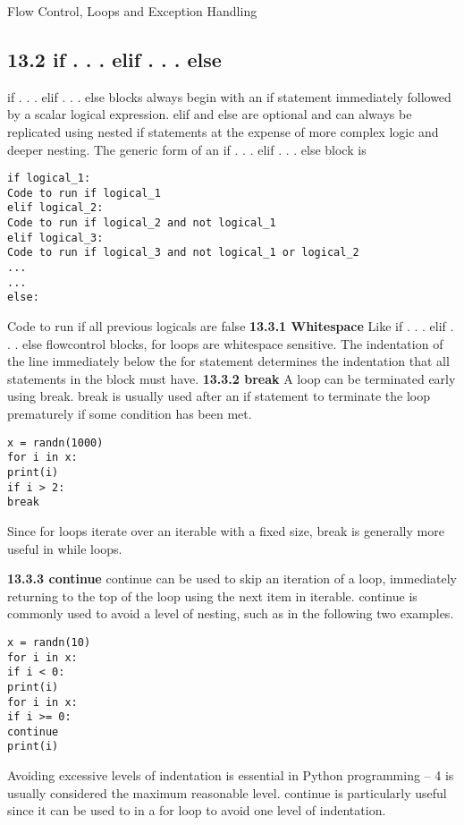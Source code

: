 %		

Flow Control, Loops and Exception Handling
\subsection{13.2 if . . . elif . . . else}
if . . . elif . . . else blocks always begin with an if statement immediately followed by a scalar logical
expression. elif and else are optional and can always be replicated using nested if statements at the
expense of more complex logic and deeper nesting. The generic form of an if . . . elif . . . else block is

\begin{framed}
\begin{verbatim}
if logical_1:
Code to run if logical_1
elif logical_2:
Code to run if logical_2 and not logical_1
elif logical_3:
Code to run if logical_3 and not logical_1 or logical_2
...
...
else:
\end{verbatim}
\end{framed}
Code to run if all previous logicals are false
\newpage
\textbf{13.3.1 Whitespace}
Like if . . . elif . . . else flowcontrol blocks, for loops are whitespace sensitive. The indentation of the line
immediately below the for statement determines the indentation that all statements in the block must
have.
\textbf{13.3.2 break}
A loop can be terminated early using break. break is usually used after an if statement to terminate the
loop prematurely if some condition has been met.
\begin{framed}
\begin{verbatim}
x = randn(1000)
for i in x:
print(i)
if i > 2:
break
\end{verbatim}
\end{framed}
Since for loops iterate over an iterable with a fixed size, break is generally more useful in while loops.

\textbf{13.3.3 continue}
continue can be used to skip an iteration of a loop, immediately returning to the top of the loop using the
next item in iterable. continue is commonly used to avoid a level of nesting, such as in the following two
examples.
\begin{framed}
\begin{verbatim}
x = randn(10)
for i in x:
if i < 0:
print(i)
for i in x:
if i >= 0:
continue
print(i)
\end{verbatim}
\end{framed}
Avoiding excessive levels of indentation is essential in Python programming – 4 is usually considered the
maximum reasonable level. continue is particularly useful since it can be used to in a for loop to avoid
one level of indentation.
\newpage
